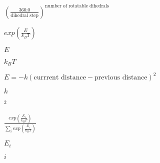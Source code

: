 \documentclass{article}
\begin{document}
$(\frac{360.0}{\textrm{dihedral step}})^{\textrm{number of rotatable dihedrals}}$
\pagebreak

$exp(\frac{E}{k_{B}T})$
\pagebreak

$E$
\pagebreak

$k_{B}T$
\pagebreak

$E=-k(\textrm{currrent distance} - \textrm{previous distance})^2$
\pagebreak

$k$
\pagebreak

$^2$
\pagebreak

$\frac{exp(\frac{E_i}{k_{B}T})}{\sum_i exp(\frac{E_i}{k_{B}T})}$
\pagebreak

$E_i$
\pagebreak

$i$
\pagebreak
\end{document}
